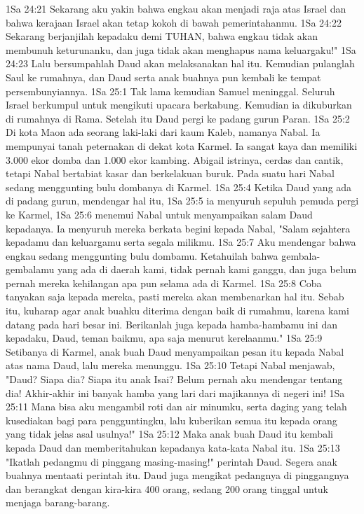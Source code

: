 1Sa 24:21  Sekarang aku yakin bahwa engkau akan menjadi raja atas Israel dan bahwa kerajaan Israel akan tetap kokoh di bawah pemerintahanmu.
1Sa 24:22  Sekarang berjanjilah kepadaku demi TUHAN, bahwa engkau tidak akan membunuh keturunanku, dan juga tidak akan menghapus nama keluargaku!"
1Sa 24:23  Lalu bersumpahlah Daud akan melaksanakan hal itu. Kemudian pulanglah Saul ke rumahnya, dan Daud serta anak buahnya pun kembali ke tempat persembunyiannya.
1Sa 25:1  Tak lama kemudian Samuel meninggal. Seluruh Israel berkumpul untuk mengikuti upacara berkabung. Kemudian ia dikuburkan di rumahnya di Rama. Setelah itu Daud pergi ke padang gurun Paran.
1Sa 25:2  Di kota Maon ada seorang laki-laki dari kaum Kaleb, namanya Nabal. Ia mempunyai tanah peternakan di dekat kota Karmel. Ia sangat kaya dan memiliki 3.000 ekor domba dan 1.000 ekor kambing. Abigail istrinya, cerdas dan cantik, tetapi Nabal bertabiat kasar dan berkelakuan buruk. Pada suatu hari Nabal sedang menggunting bulu dombanya di Karmel.
1Sa 25:4  Ketika Daud yang ada di padang gurun, mendengar hal itu,
1Sa 25:5  ia menyuruh sepuluh pemuda pergi ke Karmel,
1Sa 25:6  menemui Nabal untuk menyampaikan salam Daud kepadanya. Ia menyuruh mereka berkata begini kepada Nabal, "Salam sejahtera kepadamu dan keluargamu serta segala milikmu.
1Sa 25:7  Aku mendengar bahwa engkau sedang menggunting bulu dombamu. Ketahuilah bahwa gembala-gembalamu yang ada di daerah kami, tidak pernah kami ganggu, dan juga belum pernah mereka kehilangan apa pun selama ada di Karmel.
1Sa 25:8  Coba tanyakan saja kepada mereka, pasti mereka akan membenarkan hal itu. Sebab itu, kuharap agar anak buahku diterima dengan baik di rumahmu, karena kami datang pada hari besar ini. Berikanlah juga kepada hamba-hambamu ini dan kepadaku, Daud, teman baikmu, apa saja menurut kerelaanmu."
1Sa 25:9  Setibanya di Karmel, anak buah Daud menyampaikan pesan itu kepada Nabal atas nama Daud, lalu mereka menunggu.
1Sa 25:10  Tetapi Nabal menjawab, "Daud? Siapa dia? Siapa itu anak Isai? Belum pernah aku mendengar tentang dia! Akhir-akhir ini banyak hamba yang lari dari majikannya di negeri ini!
1Sa 25:11  Mana bisa aku mengambil roti dan air minumku, serta daging yang telah kusediakan bagi para pengguntingku, lalu kuberikan semua itu kepada orang yang tidak jelas asal usulnya!"
1Sa 25:12  Maka anak buah Daud itu kembali kepada Daud dan memberitahukan kepadanya kata-kata Nabal itu.
1Sa 25:13  "Ikatlah pedangmu di pinggang masing-masing!" perintah Daud. Segera anak buahnya mentaati perintah itu. Daud juga mengikat pedangnya di pinggangnya dan berangkat dengan kira-kira 400 orang, sedang 200 orang tinggal untuk menjaga barang-barang.

